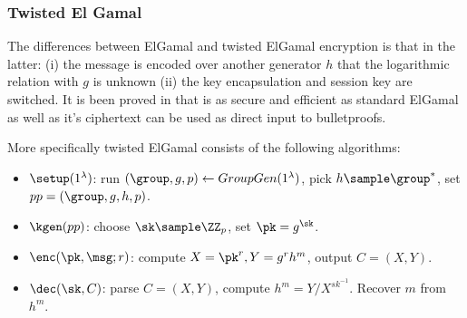\subsubsection{Twisted El Gamal}
\label{TwistedElGamal}

The differences between ElGamal and twisted ElGamal encryption is that in the latter: (i) the message is encoded over another generator $h$ that the logarithmic relation with $g$ is unknown (ii) the key encapsulation and session key are switched. It is been proved in \cite{PGC} that is as secure and efficient as standard ElGamal as well as it's ciphertext can be used as direct input to bulletproofs.

More specifically twisted ElGamal consists of the following algorithms:
\begin{itemize}
    \item $\setup(1^\lambda)$: run $(\group, g, p) \gets GroupGen(1^\lambda)$, pick $h \sample \group^*$, set $pp = (\group, g,h,p)$.
    \item $\kgen(pp)$: choose $\sk \sample \ZZ_p$, set $\pk = g^\sk$. 
    \item $\enc(\pk,\msg;r)$: compute $X = \pk^r, Y=g^r h^m$, output $C=(X,Y)$.
    \item $\dec(\sk, C)$: parse $C=(X,Y)$, compute $h^m = Y/X^{sk^{-1}}$. Recover $m$ from $h^m$. 
\end{itemize}
